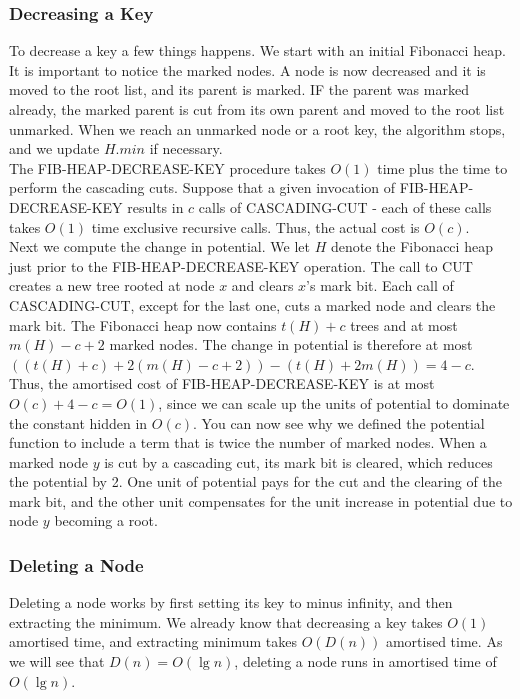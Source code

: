 \subsubsection{Decreasing a Key}
To decrease a key a few things happens. We start with an initial Fibonacci heap. It is important to notice the marked nodes. A node is now decreased and it is moved to the root list, and its parent is marked. IF the parent was marked already, the marked parent is cut from its own parent and moved to the root list unmarked. When we reach an unmarked node or a root key, the algorithm stops, and we update $H.min$ if necessary. \\

The FIB-HEAP-DECREASE-KEY procedure takes $O(1)$ time plus the time to perform the cascading cuts. Suppose that a given invocation of FIB-HEAP-DECREASE-KEY results in $c$ calls of CASCADING-CUT - each of these calls takes $O(1)$ time exclusive recursive calls. Thus, the actual cost is $O(c)$. \\

Next we compute the change in potential. We let $H$ denote the Fibonacci heap just prior to the FIB-HEAP-DECREASE-KEY operation. The call to CUT creates a new tree rooted at node $x$ and clears $x$'s mark bit. Each call of CASCADING-CUT, except for the last one, cuts a marked node and clears the mark bit. The Fibonacci heap now contains $t(H) + c$ trees and at most $m(H) - c + 2$ marked nodes. The change in potential is therefore at most \\

$((t(H) + c) + 2(m(H) -c + 2)) - (t(H) + 2m(H)) = 4 - c$. \\

Thus, the amortised cost of FIB-HEAP-DECREASE-KEY is at most $O(c) + 4 - c = O(1)$, since we can scale up the units of potential to dominate the constant hidden in $O(c)$. You can now see why we defined the potential function to include a term that is twice the number of marked nodes. When a marked node $y$ is cut by a cascading cut, its mark bit is cleared, which reduces the potential by 2. One unit of potential pays for the cut and the clearing of the mark bit, and the other unit compensates for the unit increase in potential due to node $y$ becoming a root.
%
\subsubsection{Deleting a Node}
Deleting a node works by first setting its key to minus infinity, and then extracting the minimum. We already know that decreasing a key takes $O(1)$ amortised time, and extracting minimum takes $O(D(n))$ amortised time. As we will see that $D(n) = O(\lg n)$, deleting a node runs in amortised time of $O(\lg n)$.

